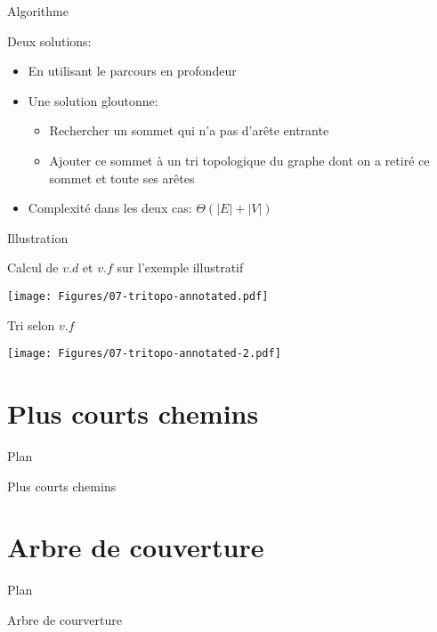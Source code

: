 \begin{frame}{Algorithme}

Deux solutions:
\begin{itemize}
\item En utilisant le parcours en profondeur
\begin{center}
{\small
{}
}
\end{center}
\bigskip

\item Une solution gloutonne:
\begin{itemize}
\item Rechercher un sommet qui n'a pas d'arête entrante 
\item Ajouter ce sommet à un tri topologique du graphe dont on a retiré ce sommet et toute ses arêtes
\end{itemize}

\bigskip

\item Complexité dans les deux cas: $\Theta(|E|+|V|)$
\end{itemize}

\end{frame}

\begin{frame}{Illustration}

Calcul de $v.d$ et $v.f$ sur l'exemple illustratif

\centerline{\texttt{[image: Figures/07-tritopo-annotated.pdf]}}

Tri selon $v.f$

\centerline{\texttt{[image: Figures/07-tritopo-annotated-2.pdf]}}

\end{frame}

\section{Plus courts chemins}

\begin{frame}{Plan}

\tableofcontents[currentsection]

\end{frame}

\begin{frame}{Plus courts chemins}

\end{frame}

\section{Arbre de couverture}

\begin{frame}{Plan}

\tableofcontents[currentsection]

\end{frame}

\begin{frame}{Arbre de courverture}
\end{frame}

